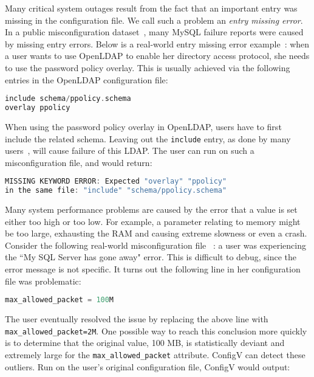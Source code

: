 Many critical system outages result from the fact that an important
entry was missing in the configuration file. 
We call such a problem an {\em entry missing error}.
In a public misconfiguration dataset~\cite{configdataset},
many MySQL failure reports were caused by
missing entry errors.
Below is a real-world entry missing error example~\cite{yin11anempirical}:
when a user wants to use OpenLDAP to enable her directory access
protocol, she needs to use the password policy overlay. This is usually
achieved via the following entries in the OpenLDAP configuration file:

\begin{lstlisting}[language=C, xleftmargin=.01\textwidth]
include schema/ppolicy.schema
overlay ppolicy
\end{lstlisting} 

When using the password policy overlay in OpenLDAP, 
users have to first include the related schema.
Leaving out the {\tt include} entry, 
as done by many users~\cite{yin11anempirical}, 
will cause failure of this LDAP. 
The user can run \app on such a misconfiguration file,
and \app would return:

\begin{lstlisting}[language=C, xleftmargin=.01\textwidth]
MISSING KEYWORD ERROR: Expected "overlay" "ppolicy"
in the same file: "include" "schema/ppolicy.schema"
\end{lstlisting} 

Many system performance problems are caused by the
error that a value is set either too high or too low.
For example, a parameter relating to memory might be too large,
exhausting the RAM and causing extreme slowness or even a crash. 
Consider the following real-world misconfiguration file%
~\cite{singleValue}: a user was experiencing the ``My SQL Server 
has gone away" error.  
This is difficult to debug, since the error message is not specific.
It turns out the following line in her configuration file was problematic:

\begin{lstlisting}[language=C, xleftmargin=.01\textwidth]
max_allowed_packet = 100M
\end{lstlisting} 

The user eventually resolved the issue by replacing the above line with {\tt max\_allowed\_packet=2M}.
One possible way to reach this conclusion more quickly is to determine that the original value, 100 MB, 
is statistically deviant and extremely large for the {\tt max\_allowed\_packet} attribute. 
ConfigV can detect these
outliers. Run on the user's original configuration file, ConfigV would output:

